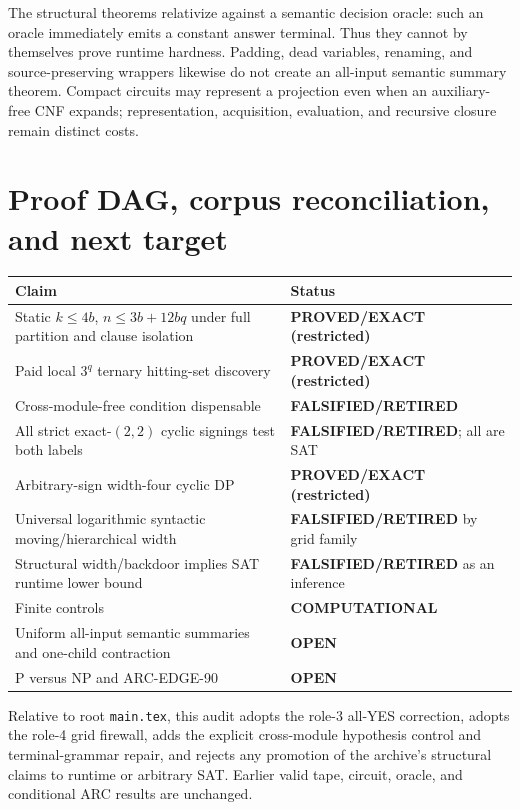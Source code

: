 \documentclass[11pt]{article}
\begin{document}
The structural theorems relativize against a semantic decision oracle: such
an oracle immediately emits a constant answer terminal.  Thus they cannot by
themselves prove runtime hardness.  Padding, dead variables, renaming, and
source-preserving wrappers likewise do not create an all-input semantic
summary theorem.  Compact circuits may represent a projection even when an
auxiliary-free CNF expands; representation, acquisition, evaluation, and
recursive closure remain distinct costs.

\section{Proof DAG, corpus reconciliation, and next target}
\begin{center}\begin{tabular}{p{.56\linewidth}p{.32\linewidth}}
\toprule Claim & Status\\\midrule
Static $k\le4b$, $n\le3b+12bq$ under full partition and clause isolation & \textbf{PROVED/EXACT (restricted)}\\
Paid local $3^q$ ternary hitting-set discovery & \textbf{PROVED/EXACT (restricted)}\\
Cross-module-free condition dispensable & \textbf{FALSIFIED/RETIRED}\\
All strict exact-$(2,2)$ cyclic signings test both labels & \textbf{FALSIFIED/RETIRED}; all are SAT\\
Arbitrary-sign width-four cyclic DP & \textbf{PROVED/EXACT (restricted)}\\
Universal logarithmic syntactic moving/hierarchical width & \textbf{FALSIFIED/RETIRED} by grid family\\
Structural width/backdoor implies SAT runtime lower bound & \textbf{FALSIFIED/RETIRED} as an inference\\
Finite controls & \textbf{COMPUTATIONAL}\\
Uniform all-input semantic summaries and one-child contraction & \textbf{OPEN}\\
P versus NP and ARC-EDGE-90 & \textbf{OPEN}\\\bottomrule
\end{tabular}\end{center}

Relative to root \texttt{main.tex}, this audit adopts the role-3 all-YES
correction, adopts the role-4 grid firewall, adds the explicit cross-module
hypothesis control and terminal-grammar repair, and rejects any promotion of
the archive's structural claims to runtime or arbitrary SAT.  Earlier valid
tape, circuit, oracle, and conditional ARC results are unchanged.
\end{document}
